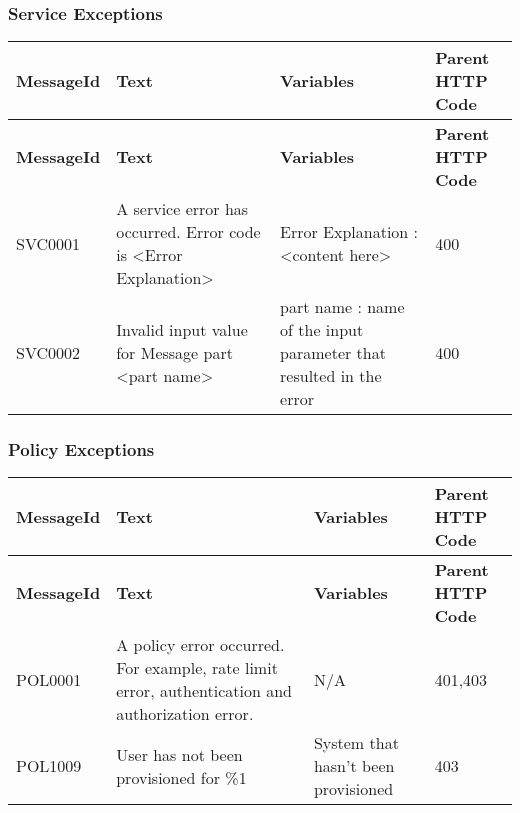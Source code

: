 \subsubsection{Service Exceptions}

\begin{comment}
List the service exceptions generated by the operation (indicate any
variation that exists across different versions):
\end{comment}


\begin{longtable}{|>{\raggedright}p{}|>{\raggedright}p{}|>{\raggedright}p{}|>{\raggedright}p{}|}
\hline
\hline 
\textbf{\footnotesize{MessageId}} & \textbf{\footnotesize{Text}} & \textbf{\footnotesize{Variables}} & \textbf{\footnotesize{Parent HTTP Code}}\tabularnewline
\hline 
\hline
\endfirsthead
\hline
\hline 
\textbf{\footnotesize{MessageId}} & \textbf{\footnotesize{Text}} & \textbf{\footnotesize{Variables}} & \textbf{\footnotesize{Parent HTTP Code}}\tabularnewline
\hline 
\hline
\endhead
\hline 
{\footnotesize{SVC0001}} & {\footnotesize{A service error has occurred. Error code is <Error
Explanation>}} & {\footnotesize{Error Explanation : <content here>}} & {\footnotesize{400}}\tabularnewline
\hline 
{\footnotesize{SVC0002}} & {\footnotesize{Invalid input value for Message part <part name>}} & {\footnotesize{part name : name of the input parameter that resulted
in the error}} & {\footnotesize{400}}\tabularnewline
\hline 
\end{longtable}




\subsubsection{Policy Exceptions}

\begin{comment}
List the policy exceptions generated by the operation (indicate any
variation that exists across different versions):
\end{comment}


\begin{longtable}{|>{\raggedright}p{}|>{\raggedright}p{}|>{\raggedright}p{}|>{\raggedright}p{}|}
\hline
\hline 
\textbf{\footnotesize{MessageId}} & \textbf{\footnotesize{Text}} & \textbf{\footnotesize{Variables}} & \textbf{\footnotesize{Parent HTTP Code}}\tabularnewline
\hline 
\hline
\endfirsthead
\hline
\hline 
\textbf{\footnotesize{MessageId}} & \textbf{\footnotesize{Text}} & \textbf{\footnotesize{Variables}} & \textbf{\footnotesize{Parent HTTP Code}}\tabularnewline
\hline 
\hline
\endhead
\hline 
{\footnotesize{POL0001}} & {\footnotesize{A policy error occurred. For example, rate limit error,
authentication and authorization error.}} & {\footnotesize{N/A}} & {\footnotesize{401,403}}\tabularnewline
\hline 
{\footnotesize{POL1009}} & {\footnotesize{User has not been provisioned for \%1}} & {\footnotesize{System that hasn’t been provisioned}} & {\footnotesize{403}}\tabularnewline
\hline 
\end{longtable}
